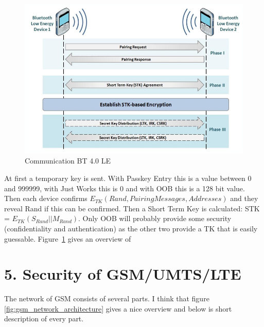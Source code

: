\documentclass{article}
\begin{document}
\begin{figure}[!h]
\centering
\includegraphics[width=\textwidth, height=\textheight, keepaspectratio]{images/bt_communication_40.png}
\caption{Communication BT 4.0 LE}
\label{fig:bt_authentication_4.0}
\end{figure}

At first a temporary key is sent. With Passkey Entry this is a value between 0 and 999999, with Just Works this is 0 and with OOB this is a 128 bit value. Then each device confirms $E_{TK}(Rand, PairingMessages, Addresses)$ and they reveal Rand if this can be confirmed. Then a Short Term Key is calculated: STK = $E_{TK}(S_{Rand} || M_{Rand})$. Only OOB will probably provide some security (confidentiality and authentication) as the other two provide a TK that is easily guessable. Figure~\ref{fig:bt_authentication_4.0} gives an overview of 

\section*{5. Security of GSM/UMTS/LTE}
The network of GSM consists of several parts. I think that figure \ref{fig:gsm_network_architecture} gives a nice overview and below is short description of every part.
\end{document}
